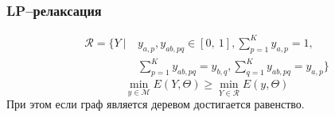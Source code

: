\documentclass[smaller,unicode,hyperref={unicode=true}]{beamer}
\begin{document}

\begin{frame}
  \frametitle{LP--релаксация}
  \begin{align*}
      \mathcal{R} = \Bigg \{ Y~|~&y_{a,p}, y_{ab,pq} \in [0,~1], \sum_{p = 1}^{K} y_{a,p} = 1,\\
    &\sum_{p = 1}^{K} y_{ab,pq} = y_{b,q}, \sum_{q = 1}^{K} y_{ab,pq} = y_{a,p} \Bigg \}
  \end{align*}
  \begin{equation*}
    \min_{y \in \mathcal{M}} E(Y, \Theta) \geq \min_{Y \in \mathcal{R}} E(y, \Theta)
  \end{equation*}
  При этом если граф является деревом достигается равенство.
\end{frame}
\end{document}
